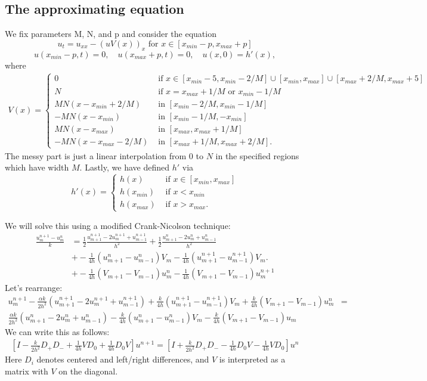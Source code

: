 \documentclass[a4paper,10pt]{article}
\begin{document}
\subsection*{The approximating equation}
We fix parameters M, N, and p  and consider the equation
\[u_t = u_{xx} - (u V(x))_x \mbox { for } x \in [x_{min} - p, x_{max} + p]\]
\[ u(x_{min} - p, t) = 0,\quad u(x_{max} + p,t) = 0, \quad u(x,0) = h'(x),\]
where
\begin{align*}
	V(x) =  \left\{
	     \begin{array}{lr}
		0	 & \mbox{ if } x \in [x_{min} - 5, x_{min}-2/M] \cup[x_{min}, x_{max}] \cup [x_{max}+2/M, x_{max} +5]\\
		N		& \mbox{ if } x = x_{max}+1/M \mbox{ or } x_{min}-1/M \\
	  MN(x - x_{min}+2/M) & \mbox{ in } [x_{min}-2/M, x_{min}-1/M] \\
	 -MN(x - x_{min}) & \mbox{ in } [x_{min} - 1/M, -x_{min}] \\
	 MN(x - x_{max}) & \mbox{ in } [x_{max},x_{max}+1/M] \\
	 -MN(x- x_{max} - 2/M) & \mbox{ in } [x_{max}+1/M, x_{max}+2/M] .
			 \end{array}
		\right.
\end{align*}
The messy part is just a linear interpolation from $0$ to $N$ in the specified regions which have width $M$.  Lastly, we have defined $h'$ via
\[ h'(x) = \left\{
     \begin{array}{lr}
		h(x) & \mbox{ if } x \in [x_{min}, x_{max}]\\
		h(x_{min})	& \mbox{ if } x < x_{min} \\
		h(x_{max}) & \mbox{ if } x>  x_{max}.
		 \end{array}
	\right.
\]

We will solve this using a modified Crank-Nicolson technique:
\begin{align*}
 \frac{u_m^{n+1} - u_m^n}{k} &= \frac{1}{2} \frac{u_{m+1}^{n+1} - 2u_m^{n+1} + u_{m-1}^{n+1}}{h^2} + \frac{1}{2} \frac{u_{m+1}^n- 2u_m^n+ u_{m-1}^n}{h^2} \\
  &+ -\frac{1}{4h}(u_{m+1}^n - u_{m-1}^n) V_m-\frac{1}{4h}(u_{m+1}^{n+1}- u_{m-1}^{n+1}) V_m. \\
  &+ -\frac{1}{4h}(V_{m+1} - V_{m-1}) u_m^{n}-\frac{1}{4h}(V_{m+1} - V_{m-1}) u_m^{n+1}
 \end{align*}
 Let's rearrange:
\begin{align*}
 u_m^{n+1} - \frac{\alpha k}{2h^2}( u_{m+1}^{n+1} - 2u_m^{n+1} + u_{m-1}^{n+1}) +\frac{k}{4h}(u_{m+1}^{n+1}- u_{m-1}^{n+1}) V_m+ \frac{k}{4h}(V_{m+1} - V_{m-1}) u_m^{n}&=\\
  \frac{\alpha k}{2h^2}(u_{m+1}^n- 2u_m^n+ u_{m-1}^n)  -\frac{k}{4h}(u_{m+1}^n - u_{m-1}^n) V_m -\frac{k}{4h}(V_{m+1} - V_{m-1}) u_m
 \end{align*}
 We can write this as follows:
 \begin{align*}
 	\left[I - \frac{k}{2h^2}D_+D_- + \frac{1}{4h}V D_0 + \frac{1}{4h}D_0 V\right] u^{n+1} = \left[I + \frac{k}{2h^2}D_+ D_- - \frac{1}{4h}D_0 V - \frac{1}{4h}V D_0\right] u^{n}
 \end{align*}
 Here $D_i$ denotes centered and left/right differences, and $V$ is interpreted as a matrix with $V$ on the diagonal.
\end{document}
